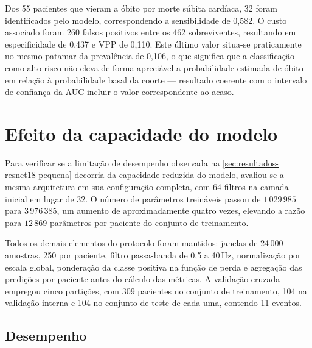 Dos 55 pacientes que vieram a óbito por morte súbita cardíaca, 32 foram
identificados pelo modelo, correspondendo a sensibilidade de 0,582. O custo
associado foram 260 falsos positivos entre os 462 sobreviventes, resultando
em especificidade de 0,437 e \gls{VPP} de 0,110. Este último valor situa-se
praticamente no mesmo patamar da prevalência de 0,106, o que significa que a
classificação como alto risco não eleva de forma apreciável a probabilidade
estimada de óbito em relação à probabilidade basal da coorte --- resultado
coerente com o intervalo de confiança da \gls{AUC} incluir o valor
correspondente ao acaso.

%

\section{Efeito da capacidade do modelo}
\label{sec:resultados-resnet18}

Para verificar se a limitação de desempenho observada na
\autoref{sec:resultados-resnet18-pequena} decorria da capacidade reduzida do
modelo, avaliou-se a mesma arquitetura em sua configuração completa, com 64
filtros na camada inicial em lugar de 32. O número de parâmetros treináveis
passou de $1\,029\,985$ para $3\,976\,385$, um aumento de aproximadamente
quatro vezes, elevando a razão para $12\,869$ parâmetros por paciente do
conjunto de treinamento.

Todos os demais elementos do protocolo foram mantidos: janelas de 24\,000
amostras, 250 por paciente, filtro passa-banda de 0,5 a 40\,Hz, normalização
por escala global, ponderação da classe positiva na função de perda e
agregação das predições por paciente antes do cálculo das métricas. A
validação cruzada empregou cinco partições, com 309 pacientes no conjunto de
treinamento, 104 na validação interna e 104 no conjunto de teste de cada uma,
contendo 11 eventos.

\subsection{Desempenho}
\label{subsec:desempenho-resnet18}

